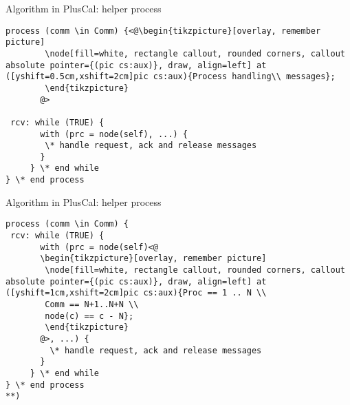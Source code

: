 \documentclass{beamer}
\begin{document}
\begin{frame}[fragile]{Algorithm in PlusCal: helper process}
        \begin{exampleblock}{}
        \begin{lstlisting}[language=pluscal, frame = none, numbers = none]
process (comm \in Comm) {<@\begin{tikzpicture}[overlay, remember picture]
        \node[fill=white, rectangle callout, rounded corners, callout absolute pointer={(pic cs:aux)}, draw, align=left] at ([yshift=0.5cm,xshift=2cm]pic cs:aux){Process handling\\ messages};
        \end{tikzpicture}
       @>
                    
 rcv: while (TRUE) {
       with (prc = node(self), ...) {
        \* handle request, ack and release messages
       }
     } \* end while
} \* end process
\end{lstlisting}
\end{exampleblock}
\end{frame}

\begin{frame}[fragile]{Algorithm in PlusCal: helper process}
\begin{exampleblock}{}
        \begin{lstlisting}[language=pluscal, frame = none, numbers = none]
process (comm \in Comm) {
 rcv: while (TRUE) {
       with (prc = node(self)<@
       \begin{tikzpicture}[overlay, remember picture]
        \node[fill=white, rectangle callout, rounded corners, callout absolute pointer={(pic cs:aux)}, draw, align=left] at ([yshift=1cm,xshift=2cm]pic cs:aux){Proc == 1 .. N \\
        Comm == N+1..N+N \\
        node(c) == c - N};
        \end{tikzpicture}
       @>, ...) {
         \* handle request, ack and release messages
       }
     } \* end while
} \* end process
**)
\end{lstlisting}
\end{exampleblock}
\end{frame}
\end{document}
